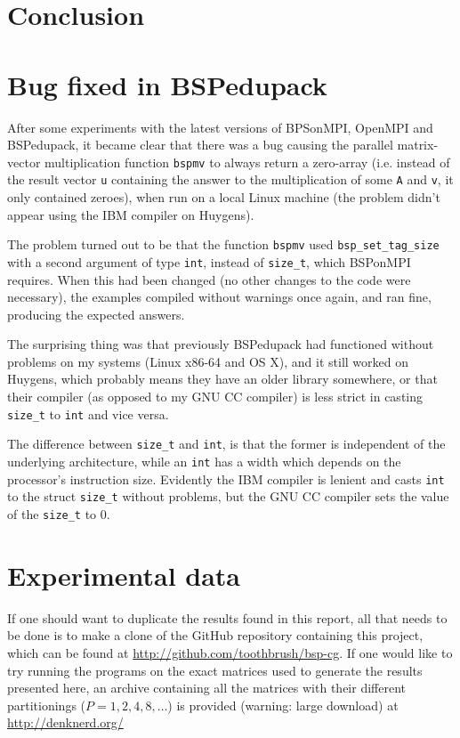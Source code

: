 \documentclass[a4paper]{article}
\begin{document}
\section{Conclusion}


\appendix

\section{Bug fixed in BSPedupack}

After some experiments with the latest versions of BPSonMPI, OpenMPI and
BSPedupack, it became clear that there was a bug causing the parallel matrix-vector
multiplication function
\texttt{bspmv} to always return a zero-array (i.e. instead of the result vector
\texttt{u} containing the answer to the multiplication of some \texttt{A} and
\texttt{v}, it only contained zeroes), when run on a local Linux machine (the
problem didn't appear using the IBM compiler on Huygens).

The problem turned out to be that the function \texttt{bspmv} used
\texttt{bsp\_set\_tag\_size} with a second argument of type \texttt{int},
instead of \texttt{size\_t}, which BSPonMPI requires. When this had been
changed (no other changes to the code were necessary), the examples compiled
without warnings once again, and ran fine, producing the expected answers.

The surprising thing was that previously BSPedupack had functioned without
problems on my systems (Linux x86-64 and OS X), and it still worked on Huygens,
which probably means they have an older library somewhere, or that their
compiler (as opposed to my GNU CC compiler) is less strict in casting \texttt{size\_t} to \texttt{int} and vice versa.

The difference between \texttt{size\_t} and \texttt{int}, is that the former is
independent of the underlying architecture, while an \texttt{int} has a width
which depends on the processor's instruction size. Evidently the IBM compiler
is lenient and casts \texttt{int} to the struct \texttt{size\_t} without
problems, but the GNU CC compiler sets the value of the \texttt{size\_t} to 0.


\section{Experimental data}

If one should want to duplicate the results found in this report, all that needs to be done
is to make a clone of the GitHub repository containing this project, which can be found at
\url{http://github.com/toothbrush/bsp-cg}. If one would like to try running the programs on the exact matrices
used to generate the results presented here, an archive containing all the matrices with their
different partitionings ($P=1,2,4,8, \ldots$) is provided (warning: large
download) at \url{http://denknerd.org/} %
\end{document}
